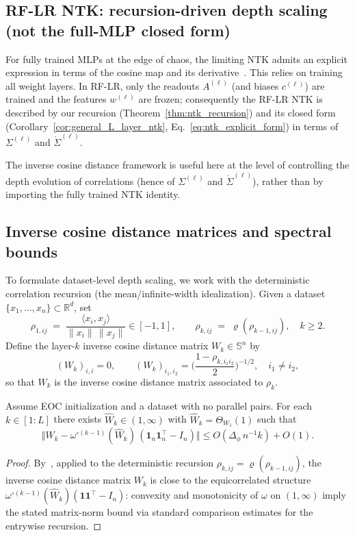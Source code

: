 \subsection{RF-LR NTK: recursion-driven depth scaling (not the full-MLP closed form)}
For fully trained MLPs at the edge of chaos, the limiting NTK admits an explicit expression in terms of the cosine map and its derivative~\cite[Proposition~4]{terjek2025mlpsateoc}. This relies on training all weight layers. In RF-LR, only the readouts \(A^{(\ell)}\) (and biases \(c^{(\ell)}\)) are trained and the features \(w^{(\ell)}\) are frozen; consequently the RF-LR NTK is described by our recursion (Theorem~\ref{thm:ntk_recursion}) and its closed form (Corollary~\ref{cor:general_L_layer_ntk}, Eq.~\eqref{eq:ntk_explicit_form}) in terms of \(\Sigma^{(\ell)}\) and \(\dot{\Sigma}^{(\ell)}\).

The inverse cosine distance framework is useful here at the level of controlling the depth evolution of correlations (hence of \(\Sigma^{(\ell)}\) and \(\dot{\Sigma}^{(\ell)}\)), rather than by importing the fully trained NTK identity.

\subsection{Inverse cosine distance matrices and spectral bounds}
To formulate dataset-level depth scaling, we work with the deterministic correlation recursion (the mean/infinite-width idealization). Given a dataset \( \{x_1,\ldots,x_n\} \subset \mathbb{R}^{d} \), set
\[
\rho_{1,ij} \;=\; \frac{\langle x_i,x_j\rangle}{\|x_i\|\,\|x_j\|}\in[-1,1],
\qquad
\rho_{k,ij} \;=\; \varrho(\rho_{k-1,ij}),\quad k\ge 2.
\]
Define the layer-\( k \) inverse cosine distance matrix \( W_k \in \mathbb{S}^n \) by
\[
(W_k)_{i,i} = 0,\qquad (W_k)_{i_1,i_2} = \biggl( \frac{1 - \rho_{k,i_1 i_2}}{2} \biggr)^{-1/2},\quad i_1 \neq i_2,
\]
so that \(W_k\) is the inverse cosine distance matrix associated to \(\rho_k\).

\begin{proposition}\label{prop:rflr-w-spectral}
Assume EOC initialization and a dataset with no parallel pairs. For each \( k \in [1:L] \) there exists \( \widehat{W}_k \in (1,\infty) \) with \( \widehat{W}_k = \Theta_{W_1}(1) \) such that
\[
\bigl\Vert W_k - \omega^{\circ(k-1)}(\widehat{W}_k)\,(\mathbf{1}_n\mathbf{1}_n^\top - I_n) \bigr\Vert \le O(\Delta_\phi\, n^{-1} k) + O(1).
\]
\end{proposition}
\begin{proof}
By~\cite[Proposition~6]{terjek2025mlpsateoc}, applied to the deterministic recursion \(\rho_{k,ij}=\varrho(\rho_{k-1,ij})\), the inverse cosine distance matrix \(W_k\) is close to the equicorrelated structure \(\omega^{\circ(k-1)}(\widehat{W}_k)(\mathbf{1}\mathbf{1}^\top-I_n)\): convexity and monotonicity of \(\omega\) on \((1,\infty)\) imply the stated matrix-norm bound via standard comparison estimates for the entrywise recursion.
\end{proof}

